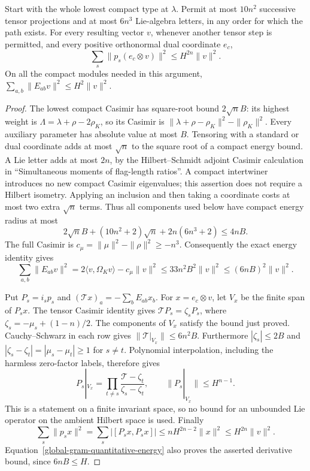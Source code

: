 \begin{lemma}
\label{global-gram-quantitative-projection}
Start with the whole lowest compact type at $\lambda$.  Permit
at most $10n^2$ successive tensor projections and at most
$6n^3$ Lie-algebra letters, in any order for which the path exists.
For every resulting vector $v$, whenever another tensor step is
permitted, and every positive orthonormal dual coordinate $e_c$,
\[
       \sum_s\|p_s(e_c\otimes v)\|^2\le H^{2n}\|v\|^2.
\]
On all the compact modules needed in this argument,
$\sum_{a,b}\|E_{ab}v\|^2\le H^2\|v\|^2$.
\end{lemma}
\begin{proof}
The lowest compact Casimir has square-root bound $2\sqrt nB$:
its highest weight is $\Lambda=\lambda+\rho-2\rho_K$, so its
Casimir is $\|\lambda+\rho-\rho_K\|^2-\|\rho_K\|^2$.
Every auxiliary parameter has absolute value at most $B$.
Tensoring with a standard or dual coordinate adds at most
$\sqrt n$ to the square root of a compact energy bound.
A Lie letter adds at most $2n$, by the Hilbert--Schmidt adjoint
Casimir calculation in ``Simultaneous moments of flag-length
ratios''.\cite{current-construction-record}
A compact intertwiner introduces no new compact Casimir
eigenvalues; this assertion does not require a Hilbert isometry.
Applying an inclusion and then taking a coordinate costs at most
two extra $\sqrt n$ terms.  Thus all components used below have
compact energy radius at most
\[
 2\sqrt nB+(10n^2+2)\sqrt n+2n(6n^3+2)\le4nB.
\]
The full Casimir is $c_\mu=\|\mu\|^2-\|\rho\|^2\ge-n^3$.
Consequently the exact energy identity gives
\begin{equation}\label{global-gram-quantitative-energy}
 \sum_{a,b}\|E_{ab}v\|^2
 =2\langle v,\Omega_Kv\rangle-c_\mu\|v\|^2
 \le33n^2B^2\|v\|^2\le(6nB)^2\|v\|^2.
\end{equation}

Put $P_s=i_sp_s$ and $(\mathcal Tx)_a=-\sum_bE_{ab}x_b$.
For $x=e_c\otimes v$, let $V_x$ be the finite span of $P_sx$.
The tensor Casimir identity gives
$\mathcal TP_s=\zeta_sP_s$, where
$\zeta_s=-\mu_s+(1-n)/2$.
The components of $V_x$ satisfy the bound just proved.
Cauchy--Schwarz in each row gives
$\|\mathcal T|_{V_x}\|\le6n^2B$.
Furthermore $|\zeta_s|\le2B$ and
$|\zeta_s-\zeta_t|=|\mu_s-\mu_t|\ge1$ for $s\ne t$.
Polynomial interpolation, including the harmless zero-factor
labels, therefore gives
\[
 P_s|_{V_x}=\prod_{t\ne s}
       \frac{\mathcal T-\zeta_t}{\zeta_s-\zeta_t},
 \qquad \|P_s|_{V_x}\|\le H^{n-1}.
\]
This is a statement on a finite invariant space, so no bound for
an unbounded Lie operator on the ambient Hilbert space is used.
Finally
\[
 \sum_s\|p_sx\|^2
 =\sum_s|[P_sx,P_sx]|
 \le nH^{2n-2}\|x\|^2\le H^{2n}\|v\|^2.
\]
Equation~\eqref{global-gram-quantitative-energy} also proves the
asserted derivative bound, since $6nB\le H$.
\end{proof}

